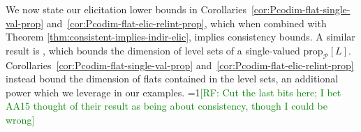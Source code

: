 \documentclass[anon,12pt]{colt2021} %
\newcommand{\Comments}{1}
\newcommand{\mynote}[2]{\ifnum\Comments=1\textcolor{#1}{#2}\fi}
\newcommand{\raf}[1]{\mynote{green}{[RF: #1]}}
\newcommand{\jessie}[1]{\mynote{purple}{[JF: #1]}}
\newcommand{\prop}[2][\mathcal{P}]{\mathrm{prop}_{#1}[#2]}
\begin{document}
We now state our elicitation lower bounds in Corollaries~\ref{cor:Pcodim-flat-single-val-prop} and~\ref{cor:Pcodim-flat-elic-relint-prop}, which when combined with Theorem \ref{thm:consistent-implies-indir-elic}, implies consistency bounds.
A similar result is \citet[Theorem 9]{agarwal2015consistent}, which bounds the dimension of level sets of a single-valued $\prop{L}$.
Corollaries~\ref{cor:Pcodim-flat-single-val-prop} and~\ref{cor:Pcodim-flat-elic-relint-prop} instead bound the dimension of flats contained in the level sets, an additional power which we leverage in our examples.
\raf{Cut the last bits here; I bet AA15 thought of their result as being about consistency, though I could be wrong}
\end{document}
